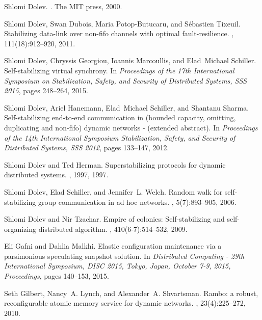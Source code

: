 \documentclass[11pt]{article}
\begin{document}
\begin{thebibliography}{10}
Shlomi Dolev.
.
\newblock The MIT press, 2000.

Shlomi Dolev, Swan Dubois, Maria Potop{-}Butucaru, and S{\'{e}}bastien Tixeuil.
\newblock Stabilizing data-link over non-fifo channels with optimal
  fault-resilience.
, 111(18):912--920, 2011.

Shlomi Dolev, Chryssis Georgiou, Ioannis Marcoullis, and Elad~Michael Schiller.
\newblock Self-stabilizing virtual synchrony.
\newblock In {\em Proceedings of the 17th International Symposium on
  Stabilization, Safety, and Security of Distributed Systems, {SSS} 2015},
  pages 248--264, 2015.

Shlomi Dolev, Ariel Hanemann, Elad~Michael Schiller, and Shantanu Sharma.
\newblock Self-stabilizing end-to-end communication in (bounded capacity,
  omitting, duplicating and non-fifo) dynamic networks - (extended abstract).
\newblock In {\em Proceedings of the 14th International Symposium
  Stabilization, Safety, and Security of Distributed Systems, {SSS} 2012},
  pages 133--147, 2012.

Shlomi Dolev and Ted Herman.
\newblock Superstabilizing protocols for dynamic distributed systems.
, 1997, 1997.

Shlomi Dolev, Elad Schiller, and Jennifer~L. Welch.
\newblock Random walk for self-stabilizing group communication in ad hoc
  networks.
, 5(7):893--905, 2006.

Shlomi Dolev and Nir Tzachar.
\newblock Empire of colonies: Self-stabilizing and self-organizing distributed
  algorithm.
, 410(6-7):514--532, 2009.

Eli Gafni and Dahlia Malkhi.
\newblock Elastic configuration maintenance via a parsimonious speculating
  snapshot solution.
\newblock In {\em Distributed Computing - 29th International Symposium, {DISC}
  2015, Tokyo, Japan, October 7-9, 2015, Proceedings}, pages 140--153, 2015.

Seth Gilbert, Nancy~A. Lynch, and Alexander~A. Shvartsman.
\newblock Rambo: a robust, reconfigurable atomic memory service for dynamic
  networks.
, 23(4):225--272, 2010.


\end{thebibliography}
\end{document}
